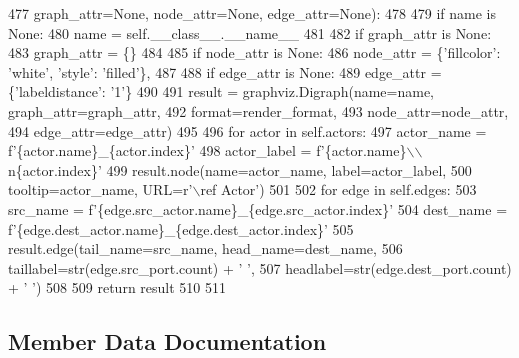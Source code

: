 \begin{DoxyCode}
477                     graph\_attr=\textcolor{keywordtype}{None}, node\_attr=\textcolor{keywordtype}{None}, edge\_attr=\textcolor{keywordtype}{None}):
478 
479         \textcolor{keywordflow}{if} name \textcolor{keywordflow}{is} \textcolor{keywordtype}{None}:
480             name = self.\_\_class\_\_.\_\_name\_\_
481 
482         \textcolor{keywordflow}{if} graph\_attr \textcolor{keywordflow}{is} \textcolor{keywordtype}{None}:
483             graph\_attr = \{\}
484 
485         \textcolor{keywordflow}{if} node\_attr \textcolor{keywordflow}{is} \textcolor{keywordtype}{None}:
486             node\_attr = \{\textcolor{stringliteral}{'fillcolor'}: \textcolor{stringliteral}{'white'}, \textcolor{stringliteral}{'style'}: \textcolor{stringliteral}{'filled'}\},
487 
488         \textcolor{keywordflow}{if} edge\_attr \textcolor{keywordflow}{is} \textcolor{keywordtype}{None}:
489             edge\_attr = \{\textcolor{stringliteral}{'labeldistance'}: \textcolor{stringliteral}{'1'}\}
490 
491         result = graphviz.Digraph(name=name, graph\_attr=graph\_attr,
492                                   format=render\_format,
493                                   node\_attr=node\_attr,
494                                   edge\_attr=edge\_attr)
495 
496         \textcolor{keywordflow}{for} actor \textcolor{keywordflow}{in} self.actors:
497             actor\_name = f\textcolor{stringliteral}{'\{actor.name\}\_\{actor.index\}'}
498             actor\_label = f\textcolor{stringliteral}{'\{actor.name\}\(\backslash\)\(\backslash\)n\{actor.index\}'}
499             result.node(name=actor\_name, label=actor\_label,
500                         tooltip=actor\_name, URL=\textcolor{stringliteral}{r'\(\backslash\)ref Actor'})
501 
502         \textcolor{keywordflow}{for} edge \textcolor{keywordflow}{in} self.edges:
503             src\_name = f\textcolor{stringliteral}{'\{edge.src\_actor.name\}\_\{edge.src\_actor.index\}'}
504             dest\_name = f\textcolor{stringliteral}{'\{edge.dest\_actor.name\}\_\{edge.dest\_actor.index\}'}
505             result.edge(tail\_name=src\_name, head\_name=dest\_name,
506                         taillabel=str(edge.src\_port.count) + \textcolor{stringliteral}{' '},
507                         headlabel=str(edge.dest\_port.count) + \textcolor{stringliteral}{' '})
508 
509         \textcolor{keywordflow}{return} result
510 
511 
\end{DoxyCode}


\subsection{Member Data Documentation}
\mbox{\label{classsylva_1_1base_1_1sdf_1_1_d_f_g_a3e404cf1c5b21b46817a26520a03aa3a}} 
